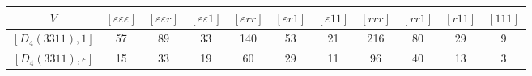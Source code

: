    \begin{table}[ht]
        \centering
        \begin{adjustbox}{max width=\linewidth}
        \begin{tabular}{|c|cccccccccc|}
        \hline
        $V$ & $[\varepsilon\varepsilon\varepsilon]$ & $[\varepsilon\varepsilon r]$ & $[\varepsilon\varepsilon 1]$ & $[\varepsilon r r]$ & $[\varepsilon r 1]$ & $[\varepsilon 1 1]$ & $[r r r]$ & $[r r 1]$ & $[r 1 1]$ & $[1 1 1]$ \\ \hline
        

        $[D_4(3311), 1]$ & 57 & 89 & 33 & 140 & 53 & 21 & 216 & 80 & 29 & 9 \\ 
        $[D_4(3311), \epsilon]$ & 15 & 33 & 19 & 60 & 29 & 11 & 96 & 40 & 13 & 3 \\ \hline


\end{tabular}
\end{adjustbox}
\end{table}

